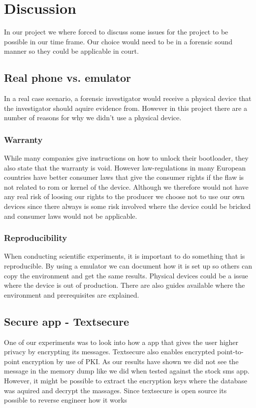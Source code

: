 \section{Discussion}
In our project we where forced to discuss some issues for the project to be 
possible in our time frame. Our choice would need to be in a forensic sound manner 
so they could be applicable in court. 
\subsection{Real phone vs. emulator}
In a real case scenario, a forensic investigator would receive a physical device 
that the investigator should aquire evidence from. However in this project there 
are a number of reasons for why we didn't use a physical device.
\subsubsection{Warranty}
While many companies give instructions on how to unlock their bootloader, they also 
state that the warranty is void. However law-regulations in many European countries 
have better consumer laws that give the consumer rights if the flaw %
is not related to rom or kernel of the device. Although we therefore would not have 
any real risk of loosing our rights to the producer we choose not to use our own 
devices since there always is some risk involved where the device could be bricked 
and consumer laws would not be applicable.
\subsubsection{Reproducibility}
When conducting scientific experiments, it is important to do something that is 
reproducible. By using a emulator we can document how it is set up so others can 
copy the environment and get the same results. Physical devices could be a issue 
where the device is out of production. There are also guides available where the 
environment and prerequisites are explained.
\subsection{Secure app - Textsecure}
One of our experiments was to look into how a app that gives the user higher 
privacy by encrypting its messages. Textsecure also enables encrypted point-to-
point encryption by use of PKI. As our results have shown we did not see the 
message in the memory dump like we did when tested against the stock sms app. 
However, it might be possible to extract the encryption keys where the database was 
aquired and decrypt the massages. Since textsecure is open source its possible to 
reverse engineer how it works %
